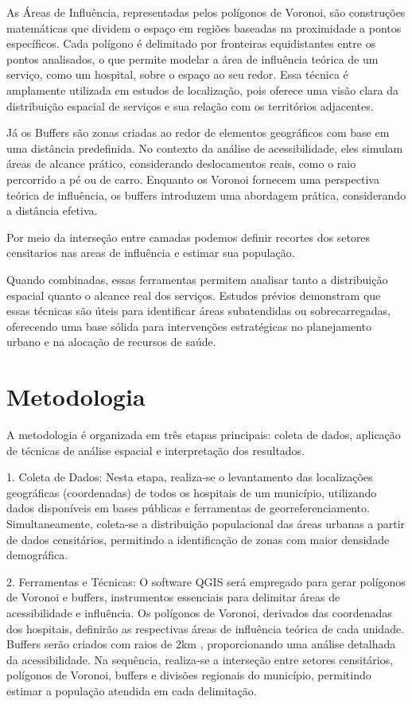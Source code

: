 \documentclass[
  8pt,
]{article}
\begin{document}
\begin{multicols}{2}
As Áreas de Influência, representadas pelos polígonos de Voronoi, são construções matemáticas que dividem o espaço em regiões baseadas na proximidade a pontos específicos. Cada polígono é delimitado por fronteiras equidistantes entre os pontos analisados, o que permite modelar a área de influência teórica de um serviço, como um hospital, sobre o espaço ao seu redor. Essa técnica é amplamente utilizada em estudos de localização, pois oferece uma visão clara da distribuição espacial de serviços e sua relação com os territórios adjacentes.

Já os Buffers são zonas criadas ao redor de elementos geográficos com base em uma distância predefinida. No contexto da análise de acessibilidade, eles simulam áreas de alcance prático, considerando deslocamentos reais, como o raio percorrido a pé ou de carro. Enquanto os Voronoi fornecem uma perspectiva teórica de influência, os buffers introduzem uma abordagem prática, considerando a distância efetiva.

Por meio da interseção entre camadas podemos definir recortes dos setores censitarios nas areas de influência e estimar sua população.

Quando combinadas, essas ferramentas permitem analisar tanto a distribuição espacial quanto o alcance real dos serviços. Estudos prévios demonstram que essas técnicas são úteis para identificar áreas subatendidas ou sobrecarregadas, oferecendo uma base sólida para intervenções estratégicas no planejamento urbano e na alocação de recursos de saúde.


\section{Metodologia}

A metodologia é organizada em três etapas principais: coleta de dados, aplicação de técnicas de análise espacial e interpretação dos resultados.

1. Coleta de Dados:
Nesta etapa, realiza-se o levantamento das localizações geográficas (coordenadas) de todos os hospitais de um município, utilizando dados disponíveis em bases públicas e ferramentas de georreferenciamento. Simultaneamente, coleta-se a distribuição populacional das áreas urbanas a partir de dados censitários, permitindo a identificação de zonas com maior densidade demográfica.

2. Ferramentas e Técnicas:
O software QGIS será empregado para gerar polígonos de Voronoi e buffers, instrumentos essenciais para delimitar áreas de acessibilidade e influência. Os polígonos de Voronoi, derivados das coordenadas dos hospitais, definirão as respectivas áreas de influência teórica de cada unidade. Buffers serão criados com raios de 2km , proporcionando uma análise detalhada da acessibilidade. Na sequência, realiza-se a interseção entre setores censitários, polígonos de Voronoi, buffers e divisões regionais do município, permitindo estimar a população atendida em cada delimitação.


\end{multicols}
\end{document}
